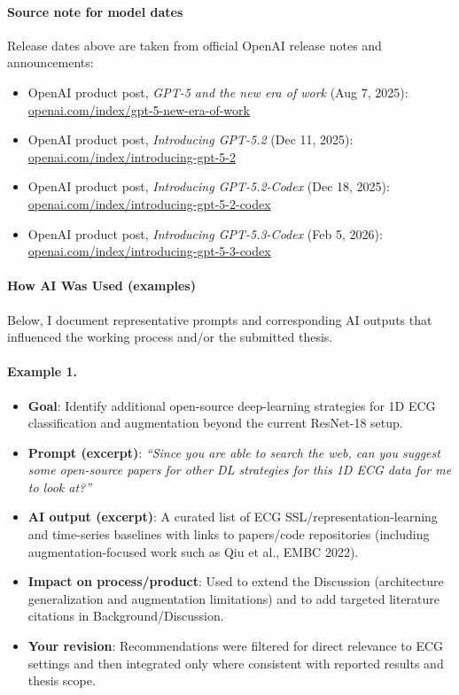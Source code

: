 \paragraph*{Source note for model dates}
Release dates above are taken from official OpenAI release notes and announcements:
\begin{itemize}
  \item OpenAI product post, \emph{GPT-5 and the new era of work} (Aug 7, 2025):\\\href{https://openai.com/index/gpt-5-new-era-of-work/}{openai.com/index/gpt-5-new-era-of-work}
  \item OpenAI product post, \emph{Introducing GPT-5.2} (Dec 11, 2025):\\\href{https://openai.com/index/introducing-gpt-5-2/}{openai.com/index/introducing-gpt-5-2}
  \item OpenAI product post, \emph{Introducing GPT-5.2-Codex} (Dec 18, 2025):\\\href{https://openai.com/index/introducing-gpt-5-2-codex/}{openai.com/index/introducing-gpt-5-2-codex}
  \item OpenAI product post, \emph{Introducing GPT-5.3-Codex} (Feb 5, 2026):\\\href{https://openai.com/index/introducing-gpt-5-3-codex/}{openai.com/index/introducing-gpt-5-3-codex}
\end{itemize}

\paragraph*{How AI Was Used (examples)}
Below, I document representative prompts and corresponding AI outputs that influenced the working process and/or the submitted thesis.

\paragraph{Example 1.}
\begin{itemize}
  \item \textbf{Goal}: Identify additional open-source deep-learning strategies for 1D ECG classification and augmentation beyond the current ResNet-18 setup.
  \item \textbf{Prompt (excerpt)}: \emph{``Since you are able to search the web, can you suggest some open-source papers for other DL strategies for this 1D ECG data for me to look at?''}
  \item \textbf{AI output (excerpt)}: A curated list of ECG SSL/representation-learning and time-series baselines with links to papers/code repositories (including augmentation-focused work such as Qiu et al., EMBC 2022).
  \item \textbf{Impact on process/product}: Used to extend the Discussion (architecture generalization and augmentation limitations) and to add targeted literature citations in Background/Discussion.
  \item \textbf{Your revision}: Recommendations were filtered for direct relevance to ECG settings and then integrated only where consistent with reported results and thesis scope.
\end{itemize}

